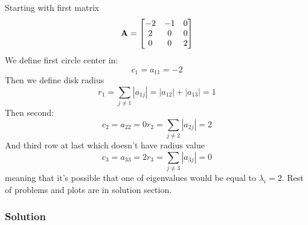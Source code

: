 Starting with first matrix
\begin{equation*}
    \mathbf{A} = 
    \begin{bmatrix}
        -2 & -1 &  0\\
         2 &  0 &  0\\
         0 &  0 &  2 
    \end{bmatrix}
\end{equation*}
We define first circle center in:
\begin{equation*}
     c_1 = a_{11} = -2
\end{equation*}
Then we define disk radius
\begin{equation*}
    r_1 = \sum_{j \neq 1} |a_{1j}| = |a_{12}| + |a_{13}| = 1 
\end{equation*}
Then second:
\begin{equation*}
    c_2 = a_{22} = 0
    r_2 = \sum_{j \neq 2} |a_{2j}| = 2
\end{equation*}
And third row at last which doesn't have radius value
\begin{equation*}
    c_3 = a_{33} = 2
    r_3 = \sum_{j \neq 3} |a_{3j}| = 0
\end{equation*}
meaning that it's possible that one of eigenvalues would be equal to $\lambda_i = 2$.
Rest of problems and plots are in solution section.
\subsubsection*{Solution}

